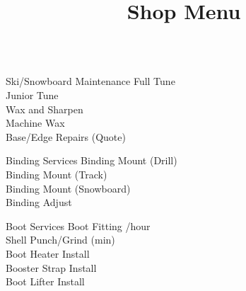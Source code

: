 \documentclass{beamer}
\title{Shop Menu}
\begin{document}
\begin{frame}[fragile]\centering
\begin{columns}[T]
    \begin{column}{.90\textwidth}
        \begin{block}{Ski/Snowboard Maintenance}
            Full Tune \hfill {}\\
            Junior Tune \hfill {}\\
            Wax and Sharpen \hfill {}\\
            Machine Wax \hfill{}\\
            Base/Edge Repairs \hfill(Quote)
        \end{block}
         \begin{block}{Binding Services}
            Binding Mount (Drill) \hfill {}\\
            Binding Mount (Track) \hfill {}\\
            Binding Mount (Snowboard)\hfill {}\\
            Binding Adjust \hfill {}
        \end{block}
        \begin{block}{Boot Services}
            Boot Fitting \hfill {}/hour\\
            Shell Punch/Grind \hfill {} (min)\\
            Boot Heater Install \hfill {}\\
            Booster Strap Install \hfill {}\\
            Boot Lifter Install \hfill {}
        \end{block}
    \end{column}
\end{columns}
\end{frame}
\end{document}
